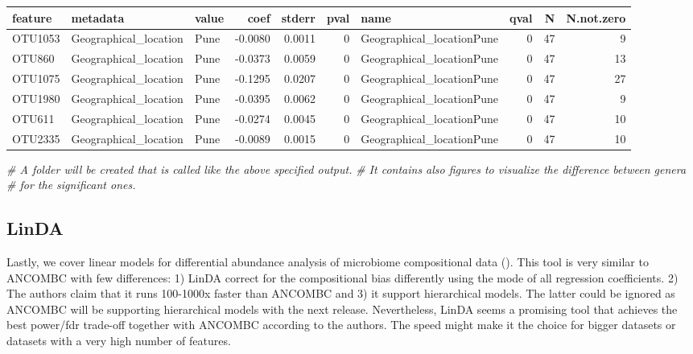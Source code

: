 \documentclass[
]{book}
\newenvironment{Shaded}{\begin{snugshade}}{\end{snugshade}}
\newcommand{\CommentTok}[1]{\textcolor[rgb]{0.56,0.35,0.01}{\textit{#1}}}
\begin{document}
\begin{tabular}{l|l|l|r|r|r|l|r|r|r}
\hline
feature & metadata & value & coef & stderr & pval & name & qval & N & N.not.zero\\
\hline
OTU1053 & Geographical\_location & Pune & -0.0080 & 0.0011 & 0 & Geographical\_locationPune & 0 & 47 & 9\\
\hline
OTU860 & Geographical\_location & Pune & -0.0373 & 0.0059 & 0 & Geographical\_locationPune & 0 & 47 & 13\\
\hline
OTU1075 & Geographical\_location & Pune & -0.1295 & 0.0207 & 0 & Geographical\_locationPune & 0 & 47 & 27\\
\hline
OTU1980 & Geographical\_location & Pune & -0.0395 & 0.0062 & 0 & Geographical\_locationPune & 0 & 47 & 9\\
\hline
OTU611 & Geographical\_location & Pune & -0.0274 & 0.0045 & 0 & Geographical\_locationPune & 0 & 47 & 10\\
\hline
OTU2335 & Geographical\_location & Pune & -0.0089 & 0.0015 & 0 & Geographical\_locationPune & 0 & 47 & 10\\
\hline
\end{tabular}

\begin{Shaded}
\begin{Highlighting}[]
\CommentTok{\# A folder will be created that is called like the above specified output.}
\CommentTok{\# It contains also figures to visualize the difference between genera }
\CommentTok{\# for the significant ones.}
\end{Highlighting}
\end{Shaded}

\hypertarget{linda}{%
\subsection{LinDA}\label{linda}}

Lastly, we cover linear models for differential abundance analysis of
microbiome compositional data (\citet{Zhou2022}). This tool is very similar
to ANCOMBC with few differences: 1) LinDA correct for the
compositional bias differently using the mode of all regression
coefficients. 2) The authors claim that it runs 100-1000x faster than
ANCOMBC and 3) it support hierarchical models. The latter could be
ignored as ANCOMBC will be supporting hierarchical models with the
next release. Nevertheless, LinDA seems a promising tool that achieves
the best power/fdr trade-off together with ANCOMBC according to the
authors. The speed might make it the choice for bigger datasets or
datasets with a very high number of features.
\end{document}
